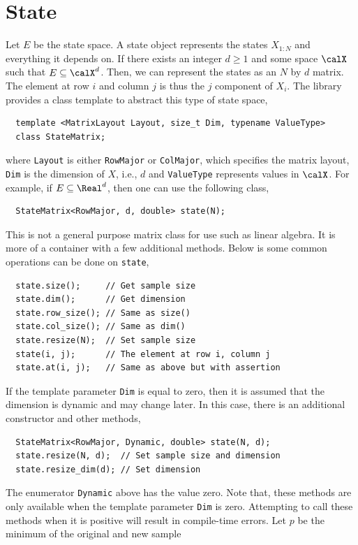 \section{State}
\label{sec:State}

Let $E$ be the state space. A state object represents the states $X_{1:N}$ and
everything it depends on. If there exists an integer $d\ge1$ and some space
$\calX$ such that $E\subseteq\calX^d$. Then, we can represent the states as an
$N$ by $d$ matrix. The element at row $i$ and column $j$ is thus the $j$\ith
component of $X_i$. The library provides a class template to abstract this type
of state space,
\begin{Verbatim}
  template <MatrixLayout Layout, size_t Dim, typename ValueType>
  class StateMatrix;
\end{Verbatim}
where \verb|Layout| is either \verb|RowMajor| or \verb|ColMajor|, which
specifies the matrix layout, \verb|Dim| is the dimension of $X$, i.e., $d$ and
\verb|ValueType| represents values in $\calX$. For example, if
$E\subseteq\Real^d$, then one can use the following class,
\begin{Verbatim}
  StateMatrix<RowMajor, d, double> state(N);
\end{Verbatim}
This is not a general purpose matrix class for use such as linear algebra. It
is more of a container with a few additional methods. Below is some common
operations can be done on \verb|state|,
\begin{Verbatim}
  state.size();     // Get sample size
  state.dim();      // Get dimension
  state.row_size(); // Same as size()
  state.col_size(); // Same as dim()
  state.resize(N);  // Set sample size
  state(i, j);      // The element at row i, column j
  state.at(i, j);   // Same as above but with assertion
\end{Verbatim}
If the template parameter \verb|Dim| is equal to zero, then it is assumed that
the dimension is dynamic and may change later. In this case, there is an
additional constructor and other methods,
\begin{Verbatim}
  StateMatrix<RowMajor, Dynamic, double> state(N, d);
  state.resize(N, d);  // Set sample size and dimension
  state.resize_dim(d); // Set dimension
\end{Verbatim}
The enumerator \verb|Dynamic| above has the value zero. Note that, these
methods are only available when the template parameter \verb|Dim| is zero.
Attempting to call these methods when it is positive will result in
compile-time errors. Let $p$ be the minimum of the original and new sample

